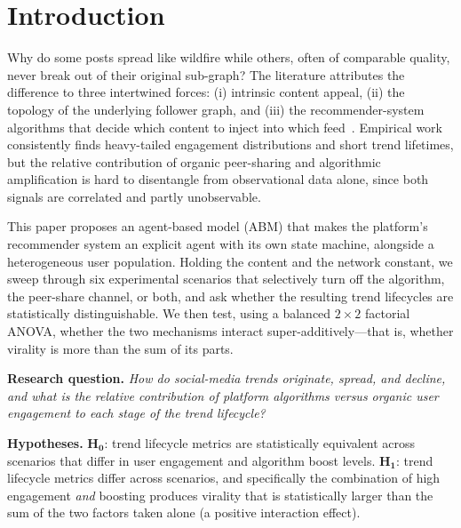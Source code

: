 \documentclass[sigconf, nonacm]{acmart}
\begin{document}
\maketitle

\section{Introduction}
Why do some posts spread like wildfire while others, often of comparable
quality, never break out of their original sub-graph?  The literature
attributes the difference to three intertwined forces: (i) intrinsic
content appeal, (ii) the topology of the underlying follower graph, and
(iii) the recommender-system algorithms that decide which content to
inject into which feed~\cite{cheng2014can,goel2016structural,bakshy2012role}.
Empirical work consistently finds heavy-tailed engagement distributions
and short trend lifetimes, but the relative contribution of organic
peer-sharing and algorithmic amplification is hard to disentangle from
observational data alone, since both signals are correlated and partly
unobservable.

This paper proposes an agent-based model (ABM) that makes the platform's
recommender system an explicit agent with its own state machine, alongside
a heterogeneous user population.  Holding the content and the network
constant, we sweep through six experimental scenarios that selectively
turn off the algorithm, the peer-share channel, or both, and ask whether
the resulting trend lifecycles are statistically distinguishable.  We then
test, using a balanced $2{\times}2$ factorial ANOVA, whether the two
mechanisms interact super-additively---that is, whether virality is more
than the sum of its parts.

\medskip
\noindent\textbf{Research question.}
\emph{How do social-media trends originate, spread, and decline, and what
is the relative contribution of platform algorithms versus organic user
engagement to each stage of the trend lifecycle?}

\medskip
\noindent\textbf{Hypotheses.}
$\mathbf{H_0}$: trend lifecycle metrics are statistically equivalent
across scenarios that differ in user engagement and algorithm boost
levels.
$\mathbf{H_1}$: trend lifecycle metrics differ across scenarios, and
specifically the combination of high engagement \emph{and} boosting
produces virality that is statistically larger than the sum of the two
factors taken alone (a positive interaction effect).
\end{document}
